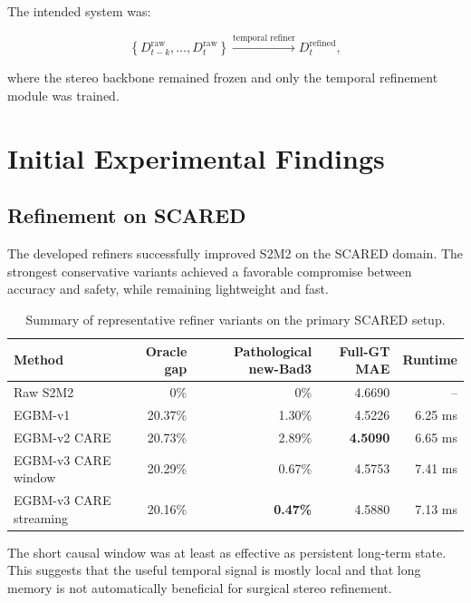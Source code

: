 \documentclass[11pt,a4paper]{article}
\newcommand{\smodel}{S2M2}
\begin{document}
The intended system was:

\begin{equation}
    \left\{
    D_{t-k}^{\mathrm{raw}}, \ldots, D_t^{\mathrm{raw}}
    \right\}
    \xrightarrow{\text{temporal refiner}}
    D_t^{\mathrm{refined}},
\end{equation}

where the stereo backbone remained frozen and only the temporal refinement module
was trained.

\section{Initial Experimental Findings}

\subsection{Refinement on SCARED}

The developed refiners successfully improved \smodel{} on the SCARED domain.
The strongest conservative variants achieved a favorable compromise between
accuracy and safety, while remaining lightweight and fast.

\begin{table}[h]
\centering
\caption{Summary of representative refiner variants on the primary SCARED setup.}
\small
\begin{tabularx}{\textwidth}{
    >{\raggedright\arraybackslash}X
    r
    r
    r
    r
}
\toprule
\textbf{Method}
& \textbf{Oracle gap}
& \textbf{Pathological new-Bad3}
& \textbf{Full-GT MAE}
& \textbf{Runtime} \\
\midrule
Raw \smodel
& 0\%
& 0\%
& 4.6690
& -- \\

EGBM-v1
& 20.37\%
& 1.30\%
& 4.5226
& 6.25 ms \\

EGBM-v2 CARE
& 20.73\%
& 2.89\%
& \textbf{4.5090}
& 6.65 ms \\

EGBM-v3 CARE window
& 20.29\%
& 0.67\%
& 4.5753
& 7.41 ms \\

EGBM-v3 CARE streaming
& 20.16\%
& \textbf{0.47\%}
& 4.5880
& 7.13 ms \\
\bottomrule
\end{tabularx}
\end{table}

The short causal window was at least as effective as persistent long-term state.
This suggests that the useful temporal signal is mostly local and that long memory
is not automatically beneficial for surgical stereo refinement.
\end{document}
